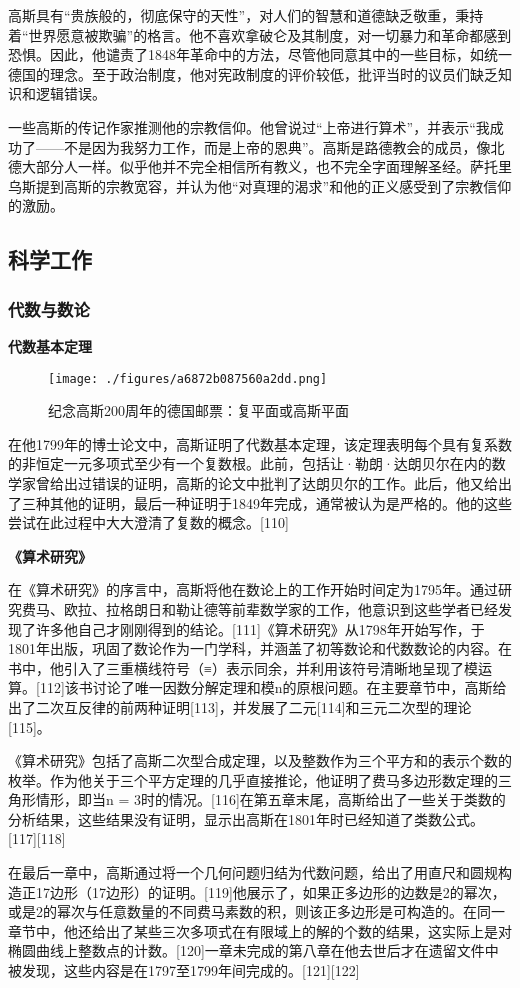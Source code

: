 高斯具有“贵族般的，彻底保守的天性”，对人们的智慧和道德缺乏敬重，秉持着“世界愿意被欺骗”的格言。他不喜欢拿破仑及其制度，对一切暴力和革命都感到恐惧。因此，他谴责了1848年革命中的方法，尽管他同意其中的一些目标，如统一德国的理念。至于政治制度，他对宪政制度的评价较低，批评当时的议员们缺乏知识和逻辑错误。

一些高斯的传记作家推测他的宗教信仰。他曾说过“上帝进行算术”，并表示“我成功了——不是因为我努力工作，而是上帝的恩典”。高斯是路德教会的成员，像北德大部分人一样。似乎他并不完全相信所有教义，也不完全字面理解圣经。萨托里乌斯提到高斯的宗教宽容，并认为他“对真理的渴求”和他的正义感受到了宗教信仰的激励。
\subsection{科学工作}  
\subsubsection{代数与数论}  
\textbf{代数基本定理}
\begin{figure}[ht]
\centering
\texttt{[image: ./figures/a6872b087560a2dd.png]}
\caption{纪念高斯200周年的德国邮票：复平面或高斯平面} \label{fig_KRGS_13}
\end{figure}
在他1799年的博士论文中，高斯证明了代数基本定理，该定理表明每个具有复系数的非恒定一元多项式至少有一个复数根。此前，包括让·勒朗·达朗贝尔在内的数学家曾给出过错误的证明，高斯的论文中批判了达朗贝尔的工作。此后，他又给出了三种其他的证明，最后一种证明于1849年完成，通常被认为是严格的。他的这些尝试在此过程中大大澄清了复数的概念。[110]

\textbf{《算术研究》}

在《算术研究》的序言中，高斯将他在数论上的工作开始时间定为1795年。通过研究费马、欧拉、拉格朗日和勒让德等前辈数学家的工作，他意识到这些学者已经发现了许多他自己才刚刚得到的结论。[111]《算术研究》从1798年开始写作，于1801年出版，巩固了数论作为一门学科，并涵盖了初等数论和代数数论的内容。在书中，他引入了三重横线符号（≡）表示同余，并利用该符号清晰地呈现了模运算。[112]该书讨论了唯一因数分解定理和模n的原根问题。在主要章节中，高斯给出了二次互反律的前两种证明[113]，并发展了二元[114]和三元二次型的理论[115]。

《算术研究》包括了高斯二次型合成定理，以及整数作为三个平方和的表示个数的枚举。作为他关于三个平方定理的几乎直接推论，他证明了费马多边形数定理的三角形情形，即当n = 3时的情况。[116]在第五章末尾，高斯给出了一些关于类数的分析结果，这些结果没有证明，显示出高斯在1801年时已经知道了类数公式。[117][118]

在最后一章中，高斯通过将一个几何问题归结为代数问题，给出了用直尺和圆规构造正17边形（17边形）的证明。[119]他展示了，如果正多边形的边数是2的幂次，或是2的幂次与任意数量的不同费马素数的积，则该正多边形是可构造的。在同一章节中，他还给出了某些三次多项式在有限域上的解的个数的结果，这实际上是对椭圆曲线上整数点的计数。[120]一章未完成的第八章在他去世后才在遗留文件中被发现，这些内容是在1797至1799年间完成的。[121][122]
